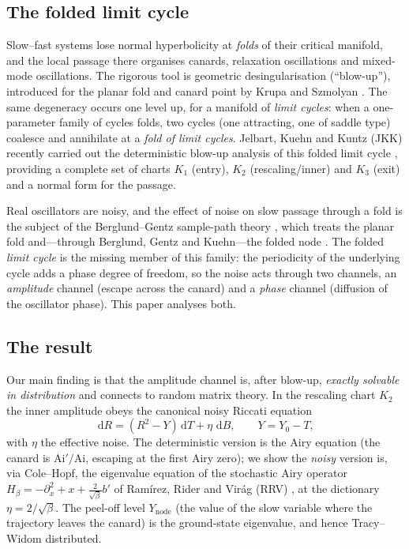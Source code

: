 \documentclass[11pt,reqno]{amsart}
\theoremstyle{plain}
\theoremstyle{definition}
\theoremstyle{remark}
\newcommand{\dd}{\,\mathrm{d}}
\newcommand{\Ai}{\mathrm{Ai}}
\newcommand{\Ynode}{Y_{\mathrm{node}}}
\begin{document}
\subsection{The folded limit cycle}
Slow--fast systems lose normal hyperbolicity at \emph{folds} of their critical manifold,
and the local passage there organises canards, relaxation oscillations and mixed-mode
oscillations. The rigorous tool is geometric desingularisation (``blow-up''), introduced
for the planar fold and canard point by Krupa and Szmolyan \cite{KS}. The same degeneracy
occurs one level up, for a manifold of \emph{limit cycles}: when a one-parameter family of
cycles folds, two cycles (one attracting, one of saddle type) coalesce and annihilate at a
\emph{fold of limit cycles}. Jelbart, Kuehn and Kuntz (JKK) recently carried out the
deterministic blow-up analysis of this folded limit cycle \cite{JKK}, providing a complete
set of charts $K_1$ (entry), $K_2$ (rescaling/inner) and $K_3$ (exit) and a normal form for
the passage.

Real oscillators are noisy, and the effect of noise on slow passage through a fold is the
subject of the Berglund--Gentz sample-path theory \cite{BG}, which treats the planar fold
and---through Berglund, Gentz and Kuehn---the folded node \cite{BGK}. The folded
\emph{limit cycle} is the missing member of this family: the periodicity of the underlying
cycle adds a phase degree of freedom, so the noise acts through two channels, an
\emph{amplitude} channel (escape across the canard) and a \emph{phase} channel (diffusion
of the oscillator phase). This paper analyses both.

\subsection{The result}
Our main finding is that the amplitude channel is, after blow-up, \emph{exactly solvable in
distribution} and connects to random matrix theory. In the rescaling chart $K_2$ the inner
amplitude obeys the canonical noisy Riccati equation
\begin{equation}\label{eq:riccati-intro}
  \dd R=(R^2-Y)\dd T+\eta\,\dd B,\qquad Y=Y_0-T,
\end{equation}
with $\eta$ the effective noise. The deterministic version is the Airy equation (the canard
is $\Ai'/\Ai$, escaping at the first Airy zero); we show the \emph{noisy} version is, via
Cole--Hopf, the eigenvalue equation of the stochastic Airy operator
$H_\beta=-\partial_x^2+x+\tfrac{2}{\sqrt\beta}b'$ of Ram\'irez, Rider and Vir\'ag (RRV)
\cite{RRV}, at the dictionary $\eta=2/\sqrt\beta$. The peel-off level $\Ynode$ (the value of
the slow variable where the trajectory leaves the canard) is the ground-state eigenvalue,
and hence Tracy--Widom distributed.
\end{document}
